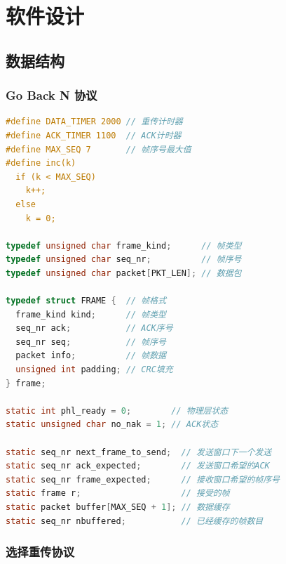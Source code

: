 \section{软件设计}

\subsection{数据结构}

\subsubsection{Go Back N 协议}

\begin{lstlisting}[language=C,basicstyle=\tiny\sfmono]
#define DATA_TIMER 2000 // 重传计时器
#define ACK_TIMER 1100  // ACK计时器
#define MAX_SEQ 7       // 帧序号最大值
#define inc(k)                                                                 \
  if (k < MAX_SEQ)                                                             \
    k++;                                                                       \
  else                                                                         \
    k = 0;

typedef unsigned char frame_kind;      // 帧类型
typedef unsigned char seq_nr;          // 帧序号
typedef unsigned char packet[PKT_LEN]; // 数据包

typedef struct FRAME {  // 帧格式
  frame_kind kind;      // 帧类型
  seq_nr ack;           // ACK序号
  seq_nr seq;           // 帧序号
  packet info;          // 帧数据
  unsigned int padding; // CRC填充
} frame;
  
static int phl_ready = 0;        // 物理层状态
static unsigned char no_nak = 1; // ACK状态

static seq_nr next_frame_to_send;  // 发送窗口下一个发送
static seq_nr ack_expected;        // 发送窗口希望的ACK
static seq_nr frame_expected;      // 接收窗口希望的帧序号
static frame r;                    // 接受的帧
static packet buffer[MAX_SEQ + 1]; // 数据缓存
static seq_nr nbuffered;           // 已经缓存的帧数目
\end{lstlisting}

\subsubsection{选择重传协议}


